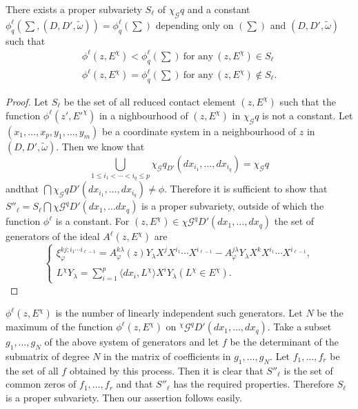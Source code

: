 \begin{proposition}\label{chap3:sec3.10:prop14}%
  There exists a proper subvariety $S_{\ell}$ of $\chi_{\mathscr{G}}q$
  and a constant $\phi ^{\ell}_q (\sum, (D, D', \tilde{\omega})) =
  \phi_{q}^{\ell}(\sum)$ depending only on $(\sum)$ and $(D,
  D',\tilde{\omega})$ such that 
  \begin{gather*}
    \phi^{\ell} \left(z, E^\chi \right) < \phi^{\ell}_q \left(\sum \right)
    ~\text{for any}~ (z,  E^\chi ) \in S_{\ell}\\ 
    \phi^{\ell}(z, E^\chi ) = \phi_q^{\ell} \left(\sum \right) ~\text{for any}~ (z,
    E^\chi ) \not\in S_{\ell}. 
  \end{gather*}
\end{proposition}

\begin{proof}
  Let $S_\ell$ be the set of all reduced contact element $(z, E^\chi)$
  such that the function $\phi^\ell (z', E'^{\chi})$ in a nighbourhood
  of $(z, E^\chi)$ in $\chi_{\mathscr{G}} q$ is not a constant. Let
  $(x_1, \ldots , x_p, y_1, \ldots , y_m)$ be a coordinate system in a
  neighbourhood of $z$ in $(D, D', \tilde{\omega})$. Then we know that 
  $$
  \bigcup_{1 \leq i_1 < \cdots < i_q \leq p} \chi_{\mathscr{G}} q_{D'}
  (dx_{i_1} , \ldots , dx_{i_q}) = \chi_{\mathscr{G}} q 
  $$
  and\pageoriginale that $\bigcap \chi_{\mathscr{G}} q D' (dx_{i_1}, \ldots ,
  dx_{i_q}) \neq \phi$. Therefore it is sufficient to show that
  $S''_{\ell} = S_{\ell} \bigcap \chi \mathscr{G}^q D' (dx_1, \ldots
  dx_q)$ is a proper subvariety, outside of which the function
  $\phi^\ell$ is a constant. For $(z, E^\chi) \in \chi \mathscr{G} ^q
  D'(dx_1, \ldots, dx_q)$ the set of generators of the ideal $A^\ell
  (z, E^{\chi})$ are 
  $$
  \begin{cases}
    \xi_{\varphi}^{kj;i_1 \cdots i_{\ell -1}} = A_{\varphi}^{k
      \lambda} (z) Y_{\lambda} X^j X^{i_1} \cdots X^{i_{\ell-1}}
    -A_{\varphi}^{j \lambda} Y_{\lambda} X^k X^{i_1} \cdots X^{i_{\ell
        -1}},\\ 
    L^\chi Y_{\lambda} = \sum_{i=1}^p \langle dx_i , L^\chi \rangle X^i Y_{\lambda}
    (L^\chi \in E^\chi).  
  \end{cases}
  $$
\end{proof}

$\phi^\ell (z, E^{\chi})$ is the number of linearly independent such
generators. Let $N$ be the maximum of the function $\phi^\ell (z,
E^{\chi})$ on $^\chi \mathscr{G}^q D'(dx_1, \ldots, dx_q)$. Take a
subset $g_1 , \ldots, g_N$ of the above system of generators and let
$f$ be the determinant of the submatrix  of degree $N$ in the matrix
of coefficients in $g_1, \ldots , g_N$. Let $f_1, \ldots , f_r$ be the
set of all $f$ obtained by this process. Then it is clear that
$S''_\ell $ is the set of common zeros of $f_1, \ldots ,f_r$ and that
$S''_\ell$ has the required properties. Therefore $S_{\ell}$ is a
proper subvariety. Then our assertion follows easily. 

